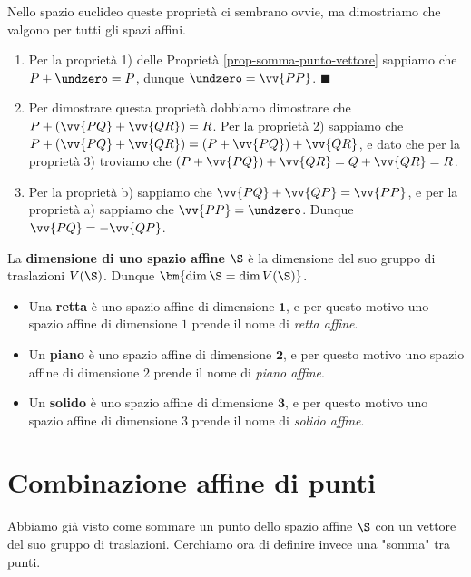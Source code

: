 \documentclass[11pt, a4paper, titlepage, oneside]{scrbook}
\begin{document}
\Dimostrazione \nopagebreak

Nello spazio euclideo queste proprietà ci sembrano ovvie, ma dimostriamo che valgono per tutti gli spazi affini.

\begin{enumerate}[label=\alph*)]
    \item Per la proprietà 1) delle Proprietà \ref{prop-somma-punto-vettore} sappiamo che $P + \undzero = P$, dunque $\undzero = \vv{PP}$. $\blacksquare$
    \item Per dimostrare questa proprietà dobbiamo dimostrare che $P + (\vv{PQ} + \vv{QR}) = R$. Per la proprietà 2) sappiamo che $P + (\vv{PQ} + \vv{QR}) = (P + \vv{PQ}) + \vv{QR}$, e dato che per la proprietà 3) troviamo che $(P + \vv{PQ}) + \vv{QR} = Q + \vv{QR} = R$.
    \item Per la proprietà b) sappiamo che $\vv{PQ} + \vv{QP} = \vv{PP}$, e per la proprietà a) sappiamo che $\vv{PP} = \undzero$. Dunque $\vv{PQ} = - \vv{QP}$.
\end{enumerate}

\begin{Definizione}
\label{def-dimensione-spazio-affine}
La \textbf{dimensione di uno spazio affine} $\S$ è la dimensione del suo gruppo di traslazioni $V(\S)$. Dunque $\bm{\dim \S = \dim V(\S)}$.
\end{Definizione}

\begin{itemize}
    \item Una \textbf{retta} è uno spazio affine di dimensione $\bm{1}$, e per questo motivo uno spazio affine di dimensione $1$ prende il nome di \textit{retta affine}.
    \item Un \textbf{piano} è uno spazio affine di dimensione $\bm{2}$, e per questo motivo uno spazio affine di dimensione $2$ prende il nome di \textit{piano affine}.
    \item Un \textbf{solido} è uno spazio affine di dimensione $\bm{3}$, e per questo motivo uno spazio affine di dimensione $3$ prende il nome di \textit{solido affine}.
\end{itemize}

\section{Combinazione affine di punti}

Abbiamo già visto come sommare un punto dello spazio affine $\S$ con un vettore del suo gruppo di traslazioni. Cerchiamo ora di definire invece una "somma" tra punti. 
\end{document}
